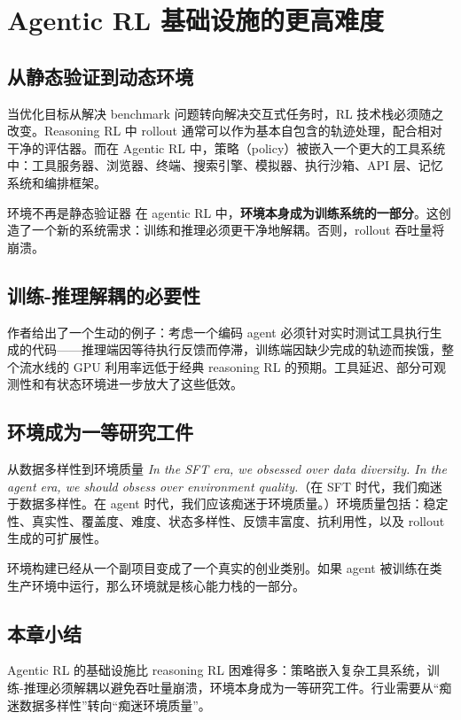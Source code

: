 \section{Agentic RL 基础设施的更高难度}

\subsection{从静态验证到动态环境}

当优化目标从解决 benchmark 问题转向解决交互式任务时，RL 技术栈必须随之改变。Reasoning RL 中 rollout 通常可以作为基本自包含的轨迹处理，配合相对干净的评估器。而在 Agentic RL 中，策略（policy）被嵌入一个更大的工具系统中：工具服务器、浏览器、终端、搜索引擎、模拟器、执行沙箱、API 层、记忆系统和编排框架。

\begin{warningbox}{环境不再是静态验证器}
在 agentic RL 中，\textbf{环境本身成为训练系统的一部分}。这创造了一个新的系统需求：训练和推理必须更干净地解耦。否则，rollout 吞吐量将崩溃。
\end{warningbox}

\subsection{训练-推理解耦的必要性}

作者给出了一个生动的例子：考虑一个编码 agent 必须针对实时测试工具执行生成的代码——推理端因等待执行反馈而停滞，训练端因缺少完成的轨迹而挨饿，整个流水线的 GPU 利用率远低于经典 reasoning RL 的预期。工具延迟、部分可观测性和有状态环境进一步放大了这些低效。

\subsection{环境成为一等研究工件}

\begin{importantbox}{从数据多样性到环境质量}
\textit{In the SFT era, we obsessed over data diversity. In the agent era, we should obsess over environment quality.}（在 SFT 时代，我们痴迷于数据多样性。在 agent 时代，我们应该痴迷于环境质量。）环境质量包括：稳定性、真实性、覆盖度、难度、状态多样性、反馈丰富度、抗利用性，以及 rollout 生成的可扩展性。
\end{importantbox}

环境构建已经从一个副项目变成了一个真实的创业类别。如果 agent 被训练在类生产环境中运行，那么环境就是核心能力栈的一部分。

\subsection{本章小结}

Agentic RL 的基础设施比 reasoning RL 困难得多：策略嵌入复杂工具系统，训练-推理必须解耦以避免吞吐量崩溃，环境本身成为一等研究工件。行业需要从``痴迷数据多样性''转向``痴迷环境质量''。


